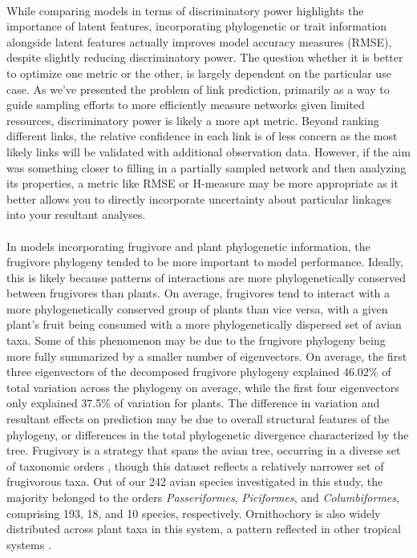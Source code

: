 \paragraph*{} 
While comparing models in terms of discriminatory power highlights the importance of latent features, incorporating phylogenetic or trait information alongside latent features actually improves model accuracy measures (RMSE), despite slightly reducing discriminatory power. The question whether it is better to optimize one metric or the other, is largely dependent on the particular use case. As we've presented the problem of link prediction, primarily as a way to guide sampling efforts to more efficiently measure networks given limited resources, discriminatory power is likely a more apt metric. Beyond ranking different links, the relative confidence in each link is of less concern as the most likely links will be validated with additional observation data. However, if the aim was something closer to filling in a partially sampled network and then analyzing its properties, a metric like RMSE or H-measure \parencite{hand2009measuring} may be more appropriate as it better allows you to directly incorporate uncertainty about particular linkages into your resultant analyses. 


\paragraph*{} In models incorporating frugivore and plant phylogenetic information, the frugivore phylogeny tended to be more important to model performance. Ideally, this is likely because patterns of interactions are more phylogenetically conserved between frugivores than plants. On average, frugivores tend to interact with a more phylogenetically conserved group of plants than vice versa, with a given plant's fruit being consumed with a more phylogenetically dispersed set of avian taxa. Some of this phenomenon may be due to the frugivore phylogeny being more fully summarized by a smaller number of eigenvectors. On average, the first three eigenvectors of the decomposed frugivore phylogeny explained $46.02\%$ of total variation across the phylogeny on average, while the first four eigenvectors only explained 37.5\% of variation for plants. The difference in variation and resultant effects on prediction may be due to overall structural features of the phylogeny, or differences in the total phylogenetic divergence characterized by the tree. Frugivory is a strategy that spans the avian tree, occurring in a diverse set of taxonomic orders \parencite{daniel2009global}, though this dataset reflects a relatively narrower set of frugivorous taxa. Out of our 242 avian species investigated in this study, the majority belonged to the orders \textit{Passeriformes}, \textit{Piciformes}, and \textit{Columbiformes}, comprising 193, 18, and 10 species, respectively. Ornithochory is also widely distributed across plant taxa in this system, a pattern reflected in other tropical systems \parencite{kuhlmann2016fruits, pizo2021frugivory}. 

